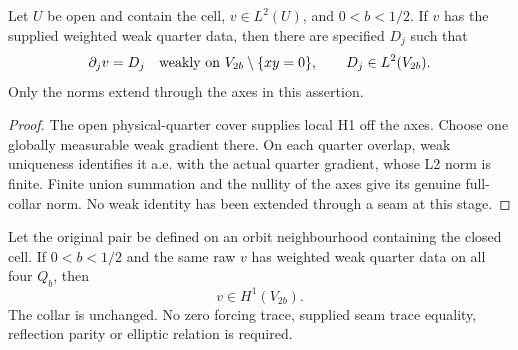 \begin{lemma}
\label{lem:weighted-quarter-off-axis-gradient}
\leanok
Let $U$ be open and contain the cell, $v\in L^2(U)$, and $0<b<1/2$.
If $v$ has the supplied weighted weak quarter data, then there are specified
$D_j$ such that
\[
 \partial_jv=D_j\quad\hbox{weakly on }
 V_{2b}\setminus\{xy=0\},\qquad D_j\in L^2(V_{2b}).
\]
Only the norms extend through the axes in this assertion.
\end{lemma}

\begin{proof}
\leanok
The open physical-quarter cover supplies local H1 off the axes.
Choose one globally measurable weak gradient there.
On each quarter overlap, weak uniqueness identifies it a.e. with the actual
quarter gradient, whose L2 norm is finite.
Finite union summation and the nullity of the axes give its genuine full-collar
norm. No weak identity has been extended through a seam at this stage.
\end{proof}

\begin{lemma}
\label{lem:transport-quarter-h1-gluing}
\leanok
Let the original pair be defined on an orbit neighbourhood containing the
closed cell. If $0<b<1/2$ and the same raw $v$ has weighted weak quarter
data on all four $Q_b$, then
\[
 v\in H^1(V_{2b}).
\]
The collar is unchanged. No zero forcing trace, supplied seam trace equality,
reflection parity or elliptic relation is required.
\end{lemma}

